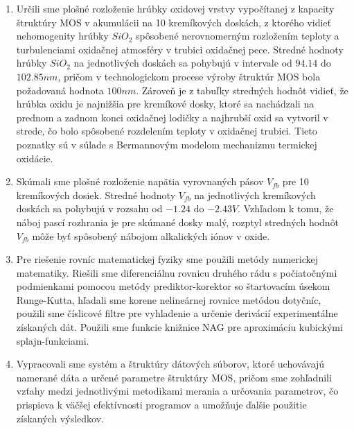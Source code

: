 \begin{enumerate}
\item Určili sme plošné rozloženie hrúbky oxidovej vrstvy vypočítanej
  z kapacity štruktúry MOS v akumulácii na 10 kremíkových doskách, z
  ktorého vidieť nehomogenity hrúbky $SiO_{2}$ spôsobené nerovnomerným
  rozložením teploty a turbulenciami oxidačnej atmosféry v trubici
  oxidačnej pece. \newline Stredné hodnoty hrúbky $SiO_{2}$ na jednotlivých
  doskách sa pohybujú v intervale od $94.14$ do $102.85 nm$, pričom
  v technologickom procese výroby štruktúr MOS bola požadovaná hodnota
  $100 nm$. \newline Zároveň je z tabuľky stredných hodnôt vidieť, že
  hrúbka oxidu je najnižšia pre kremíkové dosky, ktoré sa nachádzali
  na prednom a zadnom konci oxidačnej lodičky a najhrubší oxid sa
  vytvoril v strede, čo bolo spôsobené rozdelením teploty v oxidačnej
  trubici. Tieto poznatky sú v súlade s Bermannovým modelom mechanizmu
  termickej oxidácie.

\item Skúmali sme plošné rozloženie napätia vyrovnaných pásov $V_{fb}$
  pre 10 kremíkových dosiek. Stredné hodnoty $V_{fb}$ na jednotlivých
  kremíkových doskách sa pohybujú v rozsahu od $-1.24$ do $-2.43
  V$. Vzhľadom k tomu, že náboj pascí rozhrania je pre skúmané dosky
  malý, rozptyl stredných hodnôt $V_{fb}$ môže byť spôsobený nábojom
  alkalických iónov v oxide.

\item Pre riešenie rovníc matematickej fyziky sme použili metódy
  numerickej matematiky. Riešili sme diferenciálnu rovnicu druhého
  rádu s počiatočnými podmienkami pomocou metódy prediktor-korektor so
  štartovacím úsekom Runge-Kutta, hľadali sme korene nelineárnej
  rovnice metódou dotyčníc, použili sme číslicové filtre pre
  vyhladenie a určenie derivácií experimentálne získaných dát. Použili
  sme funkcie knižnice NAG pre aproximáciu kubickými splajn-funkciami.

\item Vypracovali sme systém a štruktúry dátových súborov, ktoré
  uchovávajú namerané dáta a určené parametre štruktúry MOS, pričom
  sme zohľadnili vzťahy medzi jednotlivými metodikami merania a
  určovania parametrov, čo prispieva k väčšej efektívnosti programov a
  umožňuje ďalšie použitie získaných výsledkov.

\end{enumerate}
